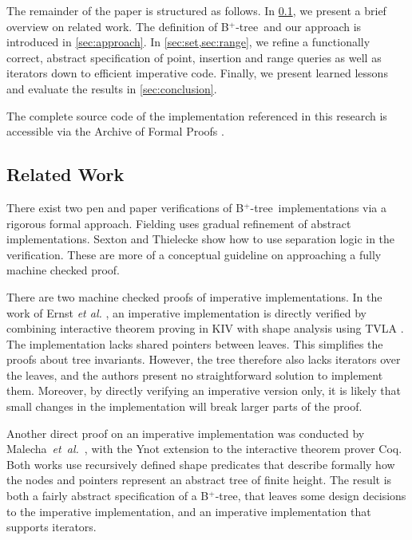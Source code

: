 \documentclass[runningheads]{llncs}
\newcommand{\btree}{B$^+$-tree}
\begin{document}
The remainder of the paper is structured as follows.
In \cref{sec:related_work}, we present a brief overview on related
work.
The definition of \btree\ and our approach is introduced in \cref{sec:approach}.
In \cref{sec:set,sec:range},
we refine a functionally correct, abstract specification of
point, insertion and range queries as well as iterators
down to efficient imperative code.
Finally, we present learned lessons and evaluate the results
in \cref{sec:conclusion}.

The complete source code of the implementation referenced in this research
is accessible via the Archive of Formal Proofs \cite{DBLP:journals/afp/Mundler21}.

\subsection{Related Work}
\label{sec:related_work}

There exist two pen and paper verifications of \btree\ implementations via a rigorous formal approach.
Fielding \cite{Fielding80} uses gradual refinement of abstract
implementations.
Sexton and Thielecke \cite{DBLP:journals/entcs/SextonT08} show how to use 
separation logic in the verification.
These are more of a conceptual guideline on approaching a fully machine checked proof.

There are two machine checked proofs of imperative implementations.
In the work of Ernst \emph{et al.} \cite{DBLP:journals/sosym/ErnstSR15},
an imperative implementation is directly verified
by combining interactive theorem proving in KIV \cite{ReifKIV}
with shape analysis using TVLA \cite{DBLP:journals/toplas/SagivRW02}.
The implementation lacks shared pointers between leaves.
This simplifies the proofs about tree invariants.
However, the tree therefore also lacks iterators over the leaves,
and the authors present no straightforward solution to implement them.
Moreover, by directly verifying an imperative version only,
it is likely that small changes in the implementation will
break larger parts of the proof.

Another direct proof on an imperative implementation
was conducted by Malecha~\emph{et~al.}~\cite{DBLP:conf/popl/MalechaMSW10}, with the Ynot
extension to the interactive theorem prover Coq.
Both works use recursively defined shape predicates
that describe formally how the nodes and pointers
represent an abstract tree of finite height.
The result is both a fairly abstract specification of a \btree,
that leaves some design decisions to the imperative implementation,
and an imperative implementation that supports
iterators.
\end{document}
